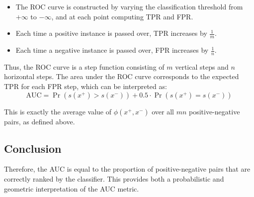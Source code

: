 \documentclass[12pt]{article}
\begin{document}
\begin{itemize}
  \item The ROC curve is constructed by varying the classification threshold from $+\infty$ to $-\infty$, and at each point computing TPR and FPR.
  \item Each time a positive instance is passed over, TPR increases by $\frac{1}{m}$.
  \item Each time a negative instance is passed over, FPR increases by $\frac{1}{n}$.
\end{itemize}

Thus, the ROC curve is a step function consisting of $m$ vertical steps and $n$ horizontal steps. The area under the ROC curve corresponds to the expected TPR for each FPR step, which can be interpreted as:
\[
\text{AUC} = \Pr(s(x^+) > s(x^-)) + 0.5 \cdot \Pr(s(x^+) = s(x^-))
\]

This is exactly the average value of $\phi(x^+, x^-)$ over all $mn$ positive-negative pairs, as defined above.
\subsection*{Conclusion}

Therefore, the AUC is equal to the proportion of positive-negative pairs that are correctly ranked by the classifier. This provides both a probabilistic and geometric interpretation of the AUC metric.
\end{document}
